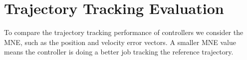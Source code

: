 \section{Trajectory Tracking Evaluation}
\label{appenJHUHTF.sec.trajTrackEvalMethod}

To compare the trajectory tracking performance of controllers we
consider the \ac{MNE}, such as the position
and velocity error vectors.
%
A smaller \ac{MNE} value means the controller is doing a better job
tracking the reference trajectory.
